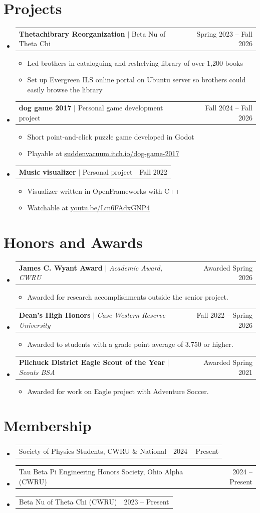 \documentclass[letterpaper,11pt]{article}
\makeatletter
\newcommand{\resumeItem}[1]{
  \item\small{
    {#1 \vspace{-2pt}}
  }
}
\newcommand{\resumeProjectHeading}[2]{
    \item
    \begin{tabular*}{0.97\textwidth}{l@{\extracolsep{\fill}}r}
      \small#1 & #2 \\
    \end{tabular*}\vspace{-7pt}
}
\newcommand{\resumeMembership}[2]{
  \item
    \begin{tabular*}{0.97\textwidth}[t]{l@{\extracolsep{\fill}}r}
      #1 & \small #2 \\
    \end{tabular*}\vspace{-6pt}
}
\newcommand{\resumeSubHeadingListStart}{\begin{itemize}[leftmargin=0.15in, label={}]}
\newcommand{\resumeSubHeadingListEnd}{\end{itemize}}
\newcommand{\resumeItemListStart}{\begin{itemize}}
\newcommand{\resumeItemListEnd}{\end{itemize}\vspace{-5pt}}
\makeatother
\begin{document}
\section{Projects}
  \resumeSubHeadingListStart
    \resumeProjectHeading
      {\textbf{Thetachibrary Reorganization} $|$ Beta Nu of Theta Chi}{Spring 2023 -- Fall 2026}
      \resumeItemListStart
        \resumeItem{Led brothers in cataloguing and reshelving library of over 1,200 books}
        \resumeItem{Set up Evergreen ILS online portal on Ubuntu server so brothers could easily browse the library}
      \resumeItemListEnd
    \resumeProjectHeading
      {\textbf{dog game 2017} $|$ Personal game development project}{Fall 2024 -- Fall 2026}
      \resumeItemListStart
        \resumeItem{Short point-and-click puzzle game developed in Godot}
        \resumeItem{Playable at \href{https://suddenvacuum.itch.io/dog-game-2017}{suddenvacuum.itch.io/dog-game-2017}}
      \resumeItemListEnd
    \resumeProjectHeading
      {\textbf{Music visualizer} $|$ Personal project}{Fall 2022}
      \resumeItemListStart
        \resumeItem{Visualizer written in OpenFrameworks with C++}
        \resumeItem{Watchable at \href{https://www.youtube.com/watch?v=Lm6FAdxGNP4}{youtu.be/Lm6FAdxGNP4}}
      \resumeItemListEnd
  \resumeSubHeadingListEnd

\section{Honors and Awards}
  \resumeSubHeadingListStart
    \resumeProjectHeading
      {\textbf{James C. Wyant Award} $|$ \emph{Academic Award, CWRU}}{Awarded Spring 2026}
      \resumeItemListStart
        \resumeItem{Awarded for research accomplishments outside the senior project.}
      \resumeItemListEnd
    \resumeProjectHeading
      {\textbf{Dean's High Honors} $|$ \emph{Case Western Reserve University}}{Fall 2022 -- Spring 2026}
      \resumeItemListStart
        \resumeItem{Awarded to students with a grade point average of 3.750 or higher.}
      \resumeItemListEnd
    \resumeProjectHeading
      {\textbf{Pilchuck District Eagle Scout of the Year} $|$ \emph{Scouts BSA}}{Awarded Spring 2021}
      \resumeItemListStart
        \resumeItem{Awarded for work on Eagle project with Adventure Soccer.}
      \resumeItemListEnd

  \resumeSubHeadingListEnd

\section{Membership}
  \resumeSubHeadingListStart
    \resumeMembership
      {Society of Physics Students, CWRU \& National}{2024 -- Present}
    \resumeMembership
      {Tau Beta Pi Engineering Honors Society, Ohio Alpha (CWRU)}{2024 -- Present}
    \resumeMembership
      {Beta Nu of Theta Chi (CWRU)}{2023 -- Present}
  \resumeSubHeadingListEnd
\end{document}
